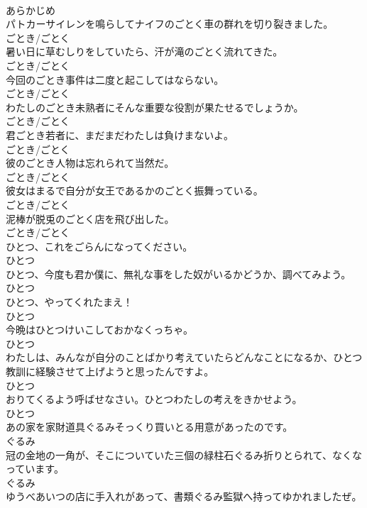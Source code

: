 \documentclass[8pt]{extreport}
\begin{document}
\begin{CJK}{UTF8}{min}
\\	あらかじめ
\\	パトカーサイレンを鳴らしてナイフのごとく車の群れを切り裂きました。	
\\	ごとき/ごとく
\\	暑い日に草むしりをしていたら、汗が滝のごとく流れてきた。	
\\	ごとき/ごとく
\\	今回のごとき事件は二度と起こしてはならない。	
\\	ごとき/ごとく
\\	わたしのごとき未熟者にそんな重要な役割が果たせるでしょうか。	
\\	ごとき/ごとく
\\	君ごとき若者に、まだまだわたしは負けまないよ。	
\\	ごとき/ごとく
\\	彼のごとき人物は忘れられて当然だ。	
\\	ごとき/ごとく
\\	彼女はまるで自分が女王であるかのごとく振舞っている。	
\\	ごとき/ごとく
\\	泥棒が脱兎のごとく店を飛び出した。	
\\	ごとき/ごとく
\\	ひとつ、これをごらんになってください。	
\\	ひとつ
\\	ひとつ、今度も君か僕に、無礼な事をした奴がいるかどうか、調べてみよう。	
\\	ひとつ
\\	ひとつ、やってくれたまえ！	
\\	ひとつ
\\	今晩はひとつけいこしておかなくっちゃ。	
\\	ひとつ
\\	わたしは、みんなが自分のことばかり考えていたらどんなことになるか、ひとつ教訓に経験させて上げようと思ったんですよ。	
\\	ひとつ
\\	おりてくるよう呼ばせなさい。ひとつわたしの考えをきかせよう。	
\\	ひとつ
\\	あの家を家財道具ぐるみそっくり買いとる用意があったのです。	
\\	ぐるみ
\\	冠の金地の一角が、そこについていた三個の緑柱石ぐるみ折りとられて、なくなっています。	
\\	ぐるみ
\\	ゆうべあいつの店に手入れがあって、書類ぐるみ監獄へ持ってゆかれましたぜ。	

\end{CJK}
\end{document}
